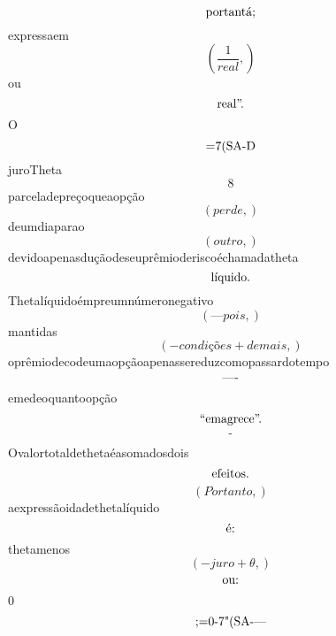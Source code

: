 \documentclass{article}
\begin{document}
\begin{equation}
$portantá;$
\end{equation}expressaem\begin{equation}
\left( \frac{1}{real},\right)
\end{equation}ou\begin{equation}
$real”.$
\end{equation}O\begin{equation}
$=7(SA-D$
\end{equation}juroTheta\begin{equation}
8
\end{equation}parceladepreçoqueaopção\begin{equation}
\left( perde,\right)
\end{equation}deumdiaparao\begin{equation}
\left( outro,\right)
\end{equation}devidoapenasduçãodeseuprêmioderiscoéchamadatheta\begin{equation}
$líquido.$
\end{equation}Thetalíquidoémpreumnúmeronegativo\begin{equation}
\left( —pois,\right)
\end{equation}mantidas\begin{equation}
\left( - condições + demais,\right)
\end{equation}oprêmiodecodeumaopçãoapenassereduzcomopassardotempo\begin{equation}
$—-$
\end{equation}emedeoquantoopção\begin{equation}
$“emagrece”.$
\end{equation}\begin{equation}
$-$
\end{equation}Ovalortotaldethetaéasomadosdois\begin{equation}
$efeitos.$
\end{equation}\begin{equation}
\left( Portanto,\right)
\end{equation}aexpressãoidadethetalíquido\begin{equation}
$é:$
\end{equation}thetamenos\begin{equation}
\left( - juro + \theta,\right)
\end{equation}\begin{equation}
$ou:$
\end{equation}0\begin{equation}
$;=0-7"(SA-—$
\end{equation}\begin{equation}

\end{equation}
\end{document}
